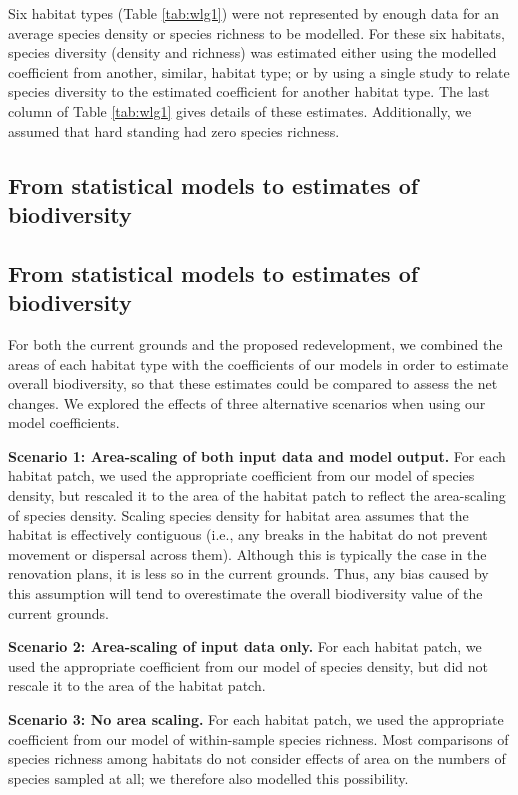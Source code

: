 Six habitat types (Table \ref{tab:wlg1}) were not represented by enough data for an average species density or species richness to be modelled. For these six habitats, species diversity (density and richness) was estimated either using the modelled coefficient from another, similar, habitat type; or by using a single study to relate species diversity to the estimated coefficient for another habitat type. The last column of Table \ref{tab:wlg1} gives details of these estimates. Additionally, we assumed that hard standing had zero species richness.

\ifappendixStyle %
\subsection{From statistical models to estimates of biodiversity}%
\else
\subsection*{From statistical models to estimates of biodiversity}
\fi

For both the current grounds and the proposed redevelopment, we combined the areas of each habitat type with the coefficients of our models in order to estimate overall biodiversity, so that these estimates could be compared to assess the net changes. We explored the effects of three alternative scenarios when using our model coefficients.

\textbf{Scenario 1: Area-scaling of both input data and model output.} For each habitat patch, we used the appropriate coefficient from our model of species density, but rescaled it to the area of the habitat patch to reflect the area-scaling of species density. Scaling species density for habitat area assumes that the habitat is effectively contiguous (i.e., any breaks in the habitat do not prevent movement or dispersal across them). Although this is typically the case in the renovation plans, it is less so in the current grounds. Thus, any bias caused by this assumption will tend to overestimate the overall biodiversity value of the current grounds.

\textbf{Scenario 2: Area-scaling of input data only.} For each habitat patch, we used the appropriate coefficient from our model of species density, but did not rescale it to the area of the habitat patch. 

\textbf{Scenario 3: No area scaling.} For each habitat patch, we used the appropriate coefficient from our model of within-sample species richness. Most comparisons of species richness among habitats do not consider effects of area on the numbers of species sampled at all; we therefore also modelled this possibility.

